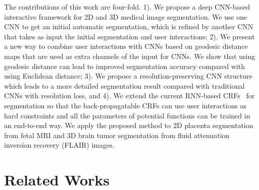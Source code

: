 \documentclass[10pt,journal,compsoc]{IEEEtran}
\begin{document}
The contributions of this work are four-fold. 1). We propose a deep CNN-based interactive framework for 2D and 3D medical image segmentation. %
We use one CNN to get an initial automatic segmentation, which is refined by another CNN that takes as input the initial segmentation and user interactions; 
2). We present a new way to combine user interactions with CNNs based on geodesic distance maps that are used as extra channels of the input for CNNs. 
We show that using geodesic distance can lead to improved segmentation accuracy compared with using Euclidean distance; 3). We propose a resolution-preserving CNN structure which leads to a more detailed segmentation result compared with traditional CNNs with resolution loss, and 4). We extend the current RNN-based CRFs~\cite{Zheng2015a} for segmentation so that the back-propagatable CRFs can use user interactions as hard constraints and all the parameters of potential functions can be trained in an end-to-end way. We apply the proposed method to 2D placenta segmentation from fetal MRI and 3D brain tumor segmentation from fluid attenuation inversion recovery (FLAIR) images.
 
 
























\section{Related Works}
\end{document}
